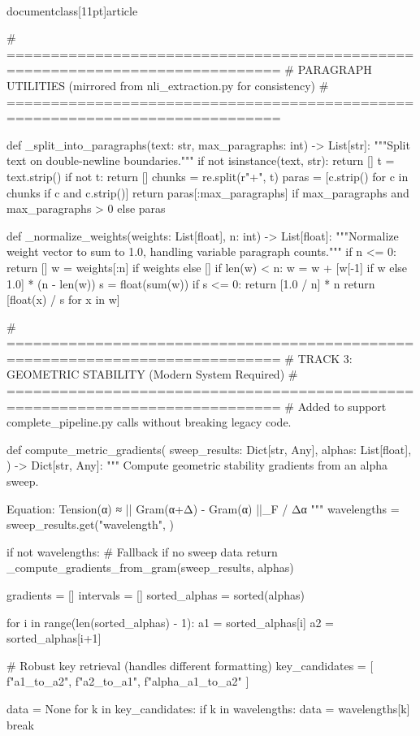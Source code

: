 \\documentclass[11pt]{article}
\begin{document}
\begin{CodeBlock}
# =============================================================================
# PARAGRAPH UTILITIES (mirrored from nli_extraction.py for consistency)
# =============================================================================

def _split_into_paragraphs(text: str, max_paragraphs: int) -> List[str]:
    """Split text on double-newline boundaries."""
    if not isinstance(text, str):
        return []
    t = text.strip()
    if not t:
        return []
    chunks = re.split(r"\n\s*\n+", t)
    paras = [c.strip() for c in chunks if c and c.strip()]
    return paras[:max_paragraphs] if max_paragraphs and max_paragraphs > 0 else paras


def _normalize_weights(weights: List[float], n: int) -> List[float]:
    """Normalize weight vector to sum to 1.0, handling variable paragraph counts."""
    if n <= 0:
        return []
    w = weights[:n] if weights else []
    if len(w) < n:
        w = w + [w[-1] if w else 1.0] * (n - len(w))
    s = float(sum(w))
    if s <= 0:
        return [1.0 / n] * n
    return [float(x) / s for x in w]


# =============================================================================
# TRACK 3: GEOMETRIC STABILITY (Modern System Required)
# =============================================================================
# Added to support complete_pipeline.py calls without breaking legacy code.

def compute_metric_gradients(
    sweep_results: Dict[str, Any],
    alphas: List[float],
) -> Dict[str, Any]:
    """
    Compute geometric stability gradients from an alpha sweep.
    
    Equation: Tension(α) ≈ || Gram(α+Δ) - Gram(α) ||_F / Δα
    """
    wavelengths = sweep_results.get("wavelength", {})
    
    if not wavelengths:
        # Fallback if no sweep data
        return _compute_gradients_from_gram(sweep_results, alphas)

    gradients = []
    intervals = []
    sorted_alphas = sorted(alphas)
    
    for i in range(len(sorted_alphas) - 1):
        a1 = sorted_alphas[i]
        a2 = sorted_alphas[i+1]
        
        # Robust key retrieval (handles different formatting)
        key_candidates = [
            f"{a1}_to_{a2}", 
            f"{a2}_to_{a1}",
            f"alpha_{a1}_to_{a2}"
        ]
        
        data = None
        for k in key_candidates:
            if k in wavelengths:
                data = wavelengths[k]
                break
            

\end{CodeBlock}
\end{document}

